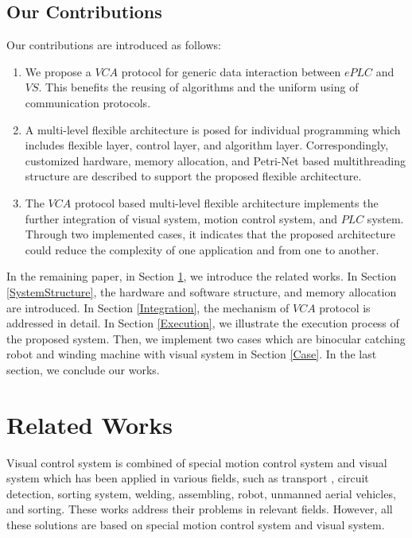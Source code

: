 \documentclass[journal,UTF8]{IEEEtran}
\begin{document}
\subsection{Our Contributions}
Our contributions are introduced as follows:
\begin{enumerate}
	\item We propose a $VCA$ protocol for generic data interaction between $ePLC$ and $VS$. This benefits the reusing of algorithms and the uniform using of communication protocols.
	\item A multi-level flexible architecture is posed for individual programming which includes flexible layer, control layer, and algorithm layer. Correspondingly, customized hardware, memory allocation, and Petri-Net based multithreading structure are described to support the proposed flexible architecture.
	\item The $VCA$ protocol based multi-level flexible architecture implements the further integration of visual system, motion control system, and $PLC$ system. Through two implemented cases, it indicates that the proposed architecture could reduce the complexity of one application and from one to another.  
\end{enumerate}

In the remaining paper, in Section \ref{RW}, we introduce the related works. In Section \ref{SystemStructure}, the hardware and software structure, and memory allocation are introduced. In Section \ref{Integration}, the mechanism of $VCA$ protocol is addressed in detail. In Section \ref{Execution}, we illustrate the execution process of the proposed system. Then, we implement two cases which are binocular catching robot and winding machine with visual system in Section \ref{Case}. In the last section, we conclude our works.

\section{Related Works}
\label{RW}
Visual control system is combined of special motion control system and visual system which has been applied in various fields, such as transport \cite{Xing2014Intersection}, circuit detection\cite{Nian2005An}, sorting system, welding\cite{Chen2014A}, assembling\cite{Xiao2014Visual}, robot\cite{Wu2013Cloud,Tsai2017A}, unmanned aerial vehicles\cite{Serra2016Landing}, and sorting\cite{Sun2013Automatic}. These works address their problems in relevant fields. However, all these solutions are based on special motion control system and visual system.
\end{document}
